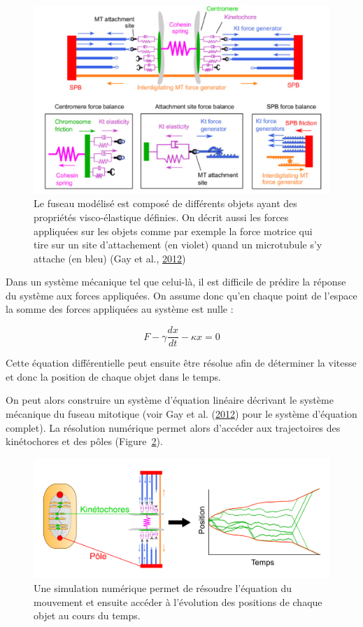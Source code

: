 \documentclass[12pt,a4paper,twoside,openright]{book}
\begin{document}
\begin{figure}[htbp]
\centering
\includegraphics{figures/intro/spindle_model.png}
\caption[Modélisation mécanique du fuseau mitotique]{\label{fig:spindle_model}Le
fuseau modélisé est composé de différents objets ayant des propriétés
visco-élastique définies. On décrit aussi les forces appliquées sur les
objets comme par exemple la force motrice qui tire sur un site
d'attachement (en violet) quand un microtubule s'y attache (en bleu)
(Gay et al., \hyperref[ref-Gay2012a]{2012})}
\end{figure}

Dans un système mécanique tel que celui-là, il est difficile de prédire
la réponse du système aux forces appliquées. On assume donc qu'en chaque
point de l'espace la somme des forces appliquées au système est nulle :

\[
F - \gamma\frac{dx}{dt} - \kappa x = 0
\]

Cette équation différentielle peut ensuite être résolue afin de
déterminer la vitesse et donc la position de chaque objet dans le temps.

On peut alors construire un système d'équation linéaire décrivant le
système mécanique du fuseau mitotique (voir Gay et al.
(\hyperref[ref-Gay2012a]{2012}) pour le système d'équation complet). La
résolution numérique permet alors d'accéder aux trajectoires des
kinétochores et des pôles (Figure~\ref{fig:traj_model}).

\begin{figure}[htbp]
\centering
\includegraphics{figures/intro/traj_model.png}
\caption[Trajectoire des chromosomes \_in silico\_]{\label{fig:traj_model}Une
simulation numérique permet de résoudre l'équation du mouvement et
ensuite accéder à l'évolution des positions de chaque objet au cours du
temps.}
\end{figure}
\end{document}
